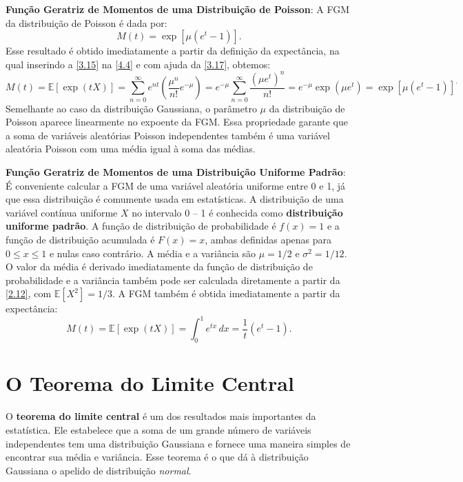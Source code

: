 \textbf{Função Geratriz de Momentos de uma Distribuição de Poisson}: A FGM da distribuição de Poisson é dada por:
\begin{equation}
M(t) = \exp\left[\mu(e^t - 1)\right].
\end{equation}
Esse resultado é obtido imediatamente a partir da definição da expectância, na qual inserindo a \autoref{3.15} na \autoref{4.4} e com ajuda da \autoref{3.17}, obtemos:
\begin{equation*}
M(t) = \mathbb{E}[\exp{\left(tX\right)}] = \sum_{n=0}^{\infty} e^{nt} \left(\dfrac{\mu^n}{n!}e^{-\mu}\right) = e^{-\mu}\sum_{n=0}^{\infty} \dfrac{( \mu e^t )^n}{n!} = e^{-\mu} \exp\left(\mu e^t\right) = \exp\left[\mu(e^t - 1)\right]^.
\end{equation*}
Semelhante ao caso da distribuição Gaussiana, o parâmetro $\mu$ da distribuição de Poisson aparece linearmente no expoente da FGM. Essa propriedade garante que a soma de variáveis aleatórias Poisson independentes também é uma variável aleatória Poisson com uma média igual à soma das médias.

\textbf{Função Geratriz de Momentos de uma Distribuição Uniforme Padrão}: É conveniente calcular a FGM de uma variável aleatória uniforme entre 0 e 1, já que essa distribuição é comumente usada em estatísticas. A distribuição de uma variável contínua uniforme $X$ no intervalo 0 -- 1 é conhecida como \textbf{distribuição uniforme padrão}. A função de distribuição de probabilidade é $f(x) = 1$ e a função de distribuição acumulada é $F(x) = x$, ambas definidas apenas para $0 \leq x \leq 1$ e nulas caso contrário. A média e a variância são $\mu = 1/2$ e $\sigma^2 = 1/12$. O valor da média é derivado imediatamente da função de distribuição de probabilidade e a variância também pode ser calculada diretamente a partir da \autoref{2.12}, com $\mathbb{E}[X^2] = 1/3$. A FGM também é obtida imediatamente a partir da expectância:
\begin{equation}
M(t) = \mathbb{E}[\exp(tX)] = \int_0^1 e^{tx} \, dx = \dfrac{1}{t}(e^t - 1).
\end{equation} 

\section{O Teorema do Limite Central}

O \textbf{teorema do limite central} é um dos resultados mais importantes da estatística. Ele estabelece que a soma de um grande número de variáveis independentes tem uma distribuição Gaussiana e fornece uma maneira simples de encontrar sua média e variância. Esse teorema é o que dá à distribuição Gaussiana o apelido de distribuição \textit{normal}.
